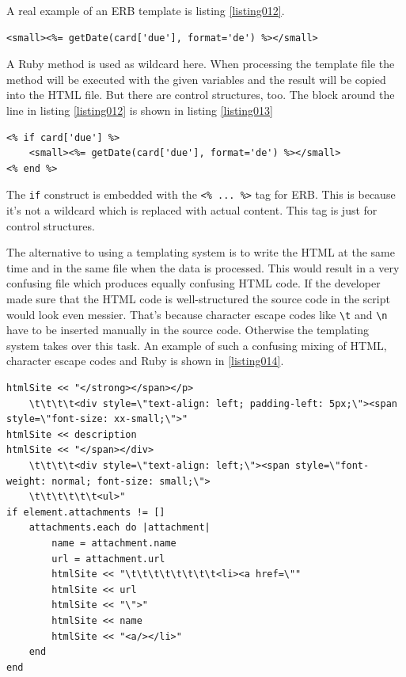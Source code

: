 A real example of an ERB template is listing \ref{listing012}.

\begin{lstlisting}[aboveskip=1\baselineskip, caption=Ruby method in ERB template., label=listing012]
<small><%= getDate(card['due'], format='de') %></small>
\end{lstlisting}

A Ruby method is used as wildcard here. When processing the template file the method will be executed with the given variables and the result will be copied into the HTML file. But there are control structures, too. The block around the line in listing \ref{listing012} is shown in listing \ref{listing013}

\begin{lstlisting}[aboveskip=1\baselineskip, caption=Ruby method in ERB template., label=listing013]
<% if card['due'] %>
	<small><%= getDate(card['due'], format='de') %></small>
<% end %>
\end{lstlisting}

The \lstinline{if} construct is embedded with the \lstinline{<% ... %>} tag for ERB. This is because it's not a wildcard which is replaced with actual content. This tag is just for control structures.

The alternative to using a templating system is to write the HTML at the same time and in the same file when the data is processed. This would result in a very confusing file which produces equally confusing HTML code. If the developer made sure that the HTML code is well-structured the source code in the script would look even messier. That's because character escape codes like \lstinline{\t} and \lstinline{\n} have to be inserted manually in the source code. Otherwise the templating system takes over this task. An example of such a confusing mixing of HTML, character escape codes and Ruby is shown in \ref{listing014}.

\begin{lstlisting}[aboveskip=1\baselineskip, caption=Generating HTML without a templating engine., label=listing014]
htmlSite << "</strong></span></p>
	\t\t\t\t<div style=\"text-align: left; padding-left: 5px;\"><span style=\"font-size: xx-small;\">"
htmlSite << description		
htmlSite << "</span></div>
	\t\t\t\t<div style=\"text-align: left;\"><span style=\"font-weight: normal; font-size: small;\"> 
	\t\t\t\t\t\t<ul>"
if element.attachments != []
	attachments.each do |attachment|
		name = attachment.name
		url = attachment.url
		htmlSite << "\t\t\t\t\t\t\t\t<li><a href=\""
		htmlSite << url
		htmlSite << "\">"
		htmlSite << name
		htmlSite << "<a/></li>"
	end	
end	
\end{lstlisting}

